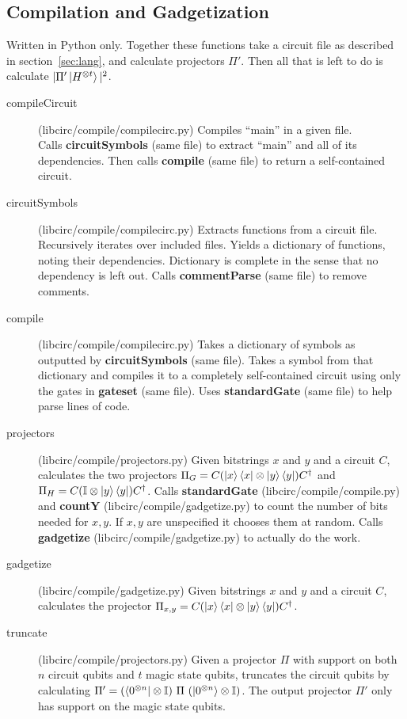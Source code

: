 \documentclass[11pt]{article}
\begin{document}
\subsection{Compilation and Gadgetization}

Written in Python only. Together these functions take a circuit file as described in section~\ref{sec:lang}, and calculate projectors $\Pi'$. Then all that is left to do is calculate $|\Pi'\ket{H^{\otimes t}}|^2$.

\begin{description}
    \item[compileCircuit] (libcirc/compile/compilecirc.py) Compiles ``main'' in a given file.\\
        Calls \textbf{circuitSymbols} (same file) to extract ``main'' and all of its dependencies.
        Then calls \textbf{compile} (same file) to return a self-contained circuit.
    \item[circuitSymbols] (libcirc/compile/compilecirc.py) Extracts functions from a circuit file.\\
        Recursively iterates over included files. Yields a dictionary of functions, noting their dependencies. Dictionary is complete in the sense that no dependency is left out.
        Calls \textbf{commentParse} (same file) to remove comments.
    \item[compile] (libcirc/compile/compilecirc.py) Takes a dictionary of symbols as outputted by \textbf{circuitSymbols} (same file). Takes a symbol from that dictionary and compiles it to a completely self-contained circuit using only the gates in \textbf{gateset} (same file). Uses \textbf{standardGate} (same file) to help parse lines of code.
    \item[projectors] (libcirc/compile/projectors.py) Given bitstrings $x$ and $y$ and a circuit $C$, calculates the two projectors $\Pi_G = C(\ket{x}\bra{x} \otimes \ket{y}\bra{y})C^\dagger$ and $\Pi_H = C(\mathbb{I} \otimes \ket{y}\bra{y})C^\dagger$. Calls \textbf{standardGate} (libcirc/compile/compile.py) and \textbf{countY} (libcirc/compile/gadgetize.py) to count the number of bits needed for $x,y$. If $x,y$ are unspecified it chooses them at random. Calls \textbf{gadgetize} (libcirc/compile/gadgetize.py) to actually do the work.
    \item[gadgetize] (libcirc/compile/gadgetize.py) Given bitstrings $x$ and $y$ and a circuit $C$, calculates the projector $\Pi_{x,y} = C(\ket{x}\bra{x} \otimes \ket{y}\bra{y})C^\dagger$.
    \item[truncate] (libcirc/compile/projectors.py) Given a projector $\Pi$ with support on both $n$ circuit qubits and $t$ magic state qubits, truncates the circuit qubits by calculating $\Pi' = (\bra{0^{\otimes n}} \otimes \mathbb{I})\text{ } \Pi \text{ } (\ket{0^{\otimes n}} \otimes \mathbb{I})$. The output projector $\Pi'$ only has support on the magic state qubits.
\end{description} 
\end{document}
